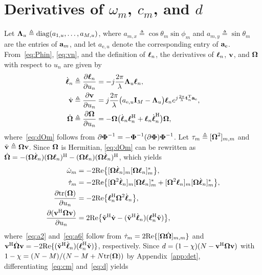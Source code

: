 \documentclass[journal]{IEEEtran}
\begin{document}
\section{Derivatives of $\omega_m$, $c_m$, and $d$}\label{app:grad}
Let $\boldsymbol{\Lambda}_u\triangleq\mathrm{diag}(a_{1,u},\ldots,a_{M,u})$, where $a_{m,x}\triangleq\cos\theta_m\sin\phi_m$ and $a_{m,y}\triangleq\sin\theta_m$ are the entries of $\mathbf{a}_m$, and let $a_{\mathrm{e},u}$ denote the corresponding entry of $\mathbf{a}_{\mathrm e}$. From~\eqref{eq:Phin}, \eqref{eq:vn}, and the definition of $\boldsymbol{\ell}_n$, the derivatives of $\boldsymbol{\ell}_n$, $\mathbf{v}$, and $\boldsymbol{\Omega}$ with respect to $u_n$ are given by
\begin{align}
\dot{\boldsymbol{\ell}}_n&\triangleq\frac{\partial\boldsymbol{\ell}_n}{\partial u_n}=-j\frac{2\pi}{\lambda}\boldsymbol{\Lambda}_u\boldsymbol{\ell}_n,\label{eq:dl}\\
\dot{\mathbf{v}}&\triangleq\frac{\partial\mathbf{v}}{\partial u_n}=j\frac{2\pi}{\lambda}\big(a_{\mathrm{e},u}\mathbf{I}_M-\boldsymbol{\Lambda}_u\big)\boldsymbol{\ell}_ne^{j\frac{2\pi}{\lambda}\mathbf{t}_n^{\mathrm T}\mathbf{a}_{\mathrm e}},\label{eq:dv}\\
\dot{\boldsymbol{\Omega}}&\triangleq\frac{\partial\boldsymbol{\Omega}}{\partial u_n}=-\boldsymbol{\Omega}\big(\dot{\boldsymbol{\ell}}_n\boldsymbol{\ell}_n^{\mathrm H}+\boldsymbol{\ell}_n\dot{\boldsymbol{\ell}}_n^{\mathrm H}\big)\boldsymbol{\Omega},\label{eq:dOm}
\end{align}
where~\eqref{eq:dOm} follows from $\partial\boldsymbol{\Phi}^{-1}=-\boldsymbol{\Phi}^{-1}(\partial\boldsymbol{\Phi})\boldsymbol{\Phi}^{-1}$. Let $\tau_m\triangleq[\boldsymbol{\Omega}^2]_{m,m}$ and $\check{\mathbf{v}}\triangleq\boldsymbol{\Omega}\mathbf{v}$. Since $\boldsymbol{\Omega}$ is Hermitian, \eqref{eq:dOm} can be rewritten as $\dot{\boldsymbol{\Omega}}=-(\boldsymbol{\Omega}\dot{\boldsymbol{\ell}}_n)(\boldsymbol{\Omega}\boldsymbol{\ell}_n)^{\mathrm H}-(\boldsymbol{\Omega}\boldsymbol{\ell}_n)(\boldsymbol{\Omega}\dot{\boldsymbol{\ell}}_n)^{\mathrm H}$, which yields
\begin{align}
\dot\omega_m&=-2\mathrm{Re}\big\{[\boldsymbol{\Omega}\dot{\boldsymbol{\ell}}_n]_m[\boldsymbol{\Omega}\boldsymbol{\ell}_n]_m^*\big\},\label{eq:a1}\\
\dot\tau_m&=-2\mathrm{Re}\big\{[\boldsymbol{\Omega}^2\dot{\boldsymbol{\ell}}_n]_m[\boldsymbol{\Omega}\boldsymbol{\ell}_n]_m^*+[\boldsymbol{\Omega}^2\boldsymbol{\ell}_n]_m[\boldsymbol{\Omega}\dot{\boldsymbol{\ell}}_n]_m^*\big\},\label{eq:a2}\\
\frac{\partial\mathrm{tr}(\boldsymbol{\Omega})}{\partial u_n}&=-2\mathrm{Re}\big\{\boldsymbol{\ell}_n^{\mathrm H}\boldsymbol{\Omega}^2\dot{\boldsymbol{\ell}}_n\big\},\label{eq:a3}\\
\frac{\partial(\mathbf{v}^{\mathrm H}\boldsymbol{\Omega}\mathbf{v})}{\partial u_n}&=2\mathrm{Re}\big\{\check{\mathbf{v}}^{\mathrm H}\dot{\mathbf{v}}-(\check{\mathbf{v}}^{\mathrm H}\dot{\boldsymbol{\ell}}_n)(\boldsymbol{\ell}_n^{\mathrm H}\check{\mathbf{v}})\big\},\label{eq:a6}
\end{align}
where~\eqref{eq:a2} and~\eqref{eq:a6} follow from $\dot\tau_m=2\mathrm{Re}\{[\boldsymbol{\Omega}\dot{\boldsymbol{\Omega}}]_{m,m}\}$ and $\mathbf{v}^{\mathrm H}\dot{\boldsymbol{\Omega}}\mathbf{v}=-2\mathrm{Re}\{(\check{\mathbf{v}}^{\mathrm H}\dot{\boldsymbol{\ell}}_n)(\boldsymbol{\ell}_n^{\mathrm H}\check{\mathbf{v}})\}$, respectively. Since $d=(1-\chi)(N-\mathbf{v}^{\mathrm H}\boldsymbol{\Omega}\mathbf{v})$ with $1-\chi=(N-M)/(N-M+N\mathrm{tr}(\boldsymbol{\Omega}))$ by Appendix~\ref{app:det}, differentiating~\eqref{eq:cm} and~\eqref{eq:d} yields
\end{document}
